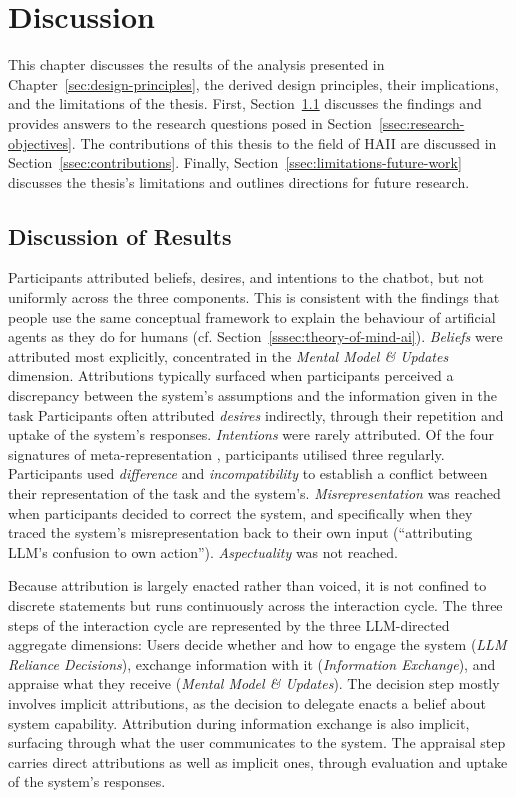 \section{Discussion} \label{sec:discussion}

This chapter discusses the results of the analysis presented in Chapter~\ref{sec:design-principles}, the derived design principles, their implications, and the limitations of the thesis. First, Section~\ref{ssec:discussion-results} discusses the findings and provides answers to the research questions posed in Section~\ref{ssec:research-objectives}. The contributions of this thesis to the field of \ac{HAII} are discussed in Section~\ref{ssec:contributions}. Finally, Section~\ref{ssec:limitations-future-work} discusses the thesis's limitations and outlines directions for future research.

\subsection{Discussion of Results} \label{ssec:discussion-results}

Participants attributed beliefs, desires, and intentions to the chatbot, but not uniformly across the three components. This is consistent with the findings that people use the same conceptual framework to explain the behaviour of artificial agents as they do for humans (cf. Section~\ref{sssec:theory-of-mind-ai}). \textit{Beliefs} were attributed most explicitly, concentrated in the \textit{Mental Model \& Updates} dimension. Attributions typically surfaced when participants perceived a discrepancy between the system's assumptions and the information given in the task Participants often attributed \textit{desires} indirectly, through their repetition and uptake of the system's responses. \textit{Intentions} were rarely attributed. Of the four signatures of meta-representation \parencite{Rakoczy2022}, participants utilised three regularly. Participants used \textit{difference} and \textit{incompatibility} to establish a conflict between their representation of the task and the system's. \textit{Misrepresentation} was reached when participants decided to correct the system, and specifically when they traced the system's misrepresentation back to their own input (\enquote{attributing LLM's confusion to own action}). \textit{Aspectuality} was not reached.

Because attribution is largely enacted rather than voiced, it is not confined to discrete statements but runs continuously across the interaction cycle. The three steps of the interaction cycle are represented by the three \ac{LLM}-directed aggregate dimensions: Users decide whether and how to engage the system (\textit{LLM Reliance Decisions}), exchange information with it (\textit{Information Exchange}), and appraise what they receive (\textit{Mental Model \& Updates}). The decision step mostly involves implicit attributions, as the decision to delegate enacts a belief about system capability. Attribution during information exchange is also implicit, surfacing through what the user communicates to the system. The appraisal step carries direct attributions as well as implicit ones, through evaluation and uptake of the system's responses.

